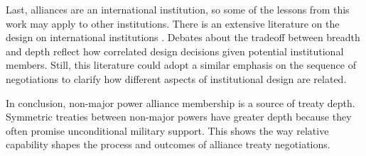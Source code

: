 \documentclass[12pt]{article}
\begin{document}
Last, alliances are an international institution, so some of the lessons from this work may apply to other institutions. 
There is an extensive literature on the design on international institutions \citep{DownesRocke1995, MartinSimmons1998, Koremenosetal2001, Koremenos2005, Thompson2010}.
Debates about the tradeoff between breadth and depth \citep{Downsetal1998, Gilligan2004} reflect how correlated design decisions given potential institutional members. 
Still, this literature could adopt a similar emphasis on the sequence of negotiations to clarify how different aspects of institutional design are related. 


In conclusion, non-major power alliance membership is a source of treaty depth. 
Symmetric treaties between non-major powers have greater depth because they often promise unconditional military support. 
This shows the way relative capability shapes the process and outcomes of alliance treaty negotiations. 



\singlespace
 
 
\end{document}
